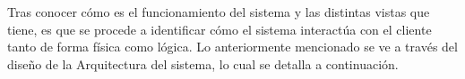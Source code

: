 Tras conocer cómo es el funcionamiento del sistema y las distintas vistas que tiene, es que se procede a identificar cómo el sistema interactúa con el cliente tanto de forma física como lógica. Lo anteriormente mencionado se ve a través del diseño de la Arquitectura del sistema, lo cual se detalla a continuación.